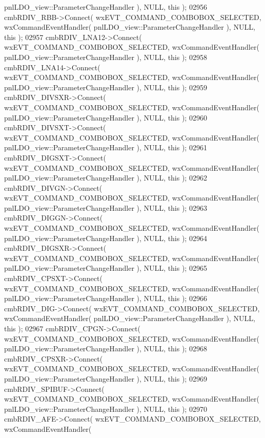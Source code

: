 \begin{DoxyCode}
      pnlLDO_view::ParameterChangeHandler ), NULL, \textcolor{keyword}{this} );
02956     cmbRDIV_RBB->Connect( wxEVT\_COMMAND\_COMBOBOX\_SELECTED, wxCommandEventHandler( 
      pnlLDO_view::ParameterChangeHandler ), NULL, \textcolor{keyword}{this} );
02957     cmbRDIV_LNA12->Connect( wxEVT\_COMMAND\_COMBOBOX\_SELECTED, wxCommandEventHandler( 
      pnlLDO_view::ParameterChangeHandler ), NULL, \textcolor{keyword}{this} );
02958     cmbRDIV_LNA14->Connect( wxEVT\_COMMAND\_COMBOBOX\_SELECTED, wxCommandEventHandler( 
      pnlLDO_view::ParameterChangeHandler ), NULL, \textcolor{keyword}{this} );
02959     cmbRDIV_DIVSXR->Connect( wxEVT\_COMMAND\_COMBOBOX\_SELECTED, wxCommandEventHandler( 
      pnlLDO_view::ParameterChangeHandler ), NULL, \textcolor{keyword}{this} );
02960     cmbRDIV_DIVSXT->Connect( wxEVT\_COMMAND\_COMBOBOX\_SELECTED, wxCommandEventHandler( 
      pnlLDO_view::ParameterChangeHandler ), NULL, \textcolor{keyword}{this} );
02961     cmbRDIV_DIGSXT->Connect( wxEVT\_COMMAND\_COMBOBOX\_SELECTED, wxCommandEventHandler( 
      pnlLDO_view::ParameterChangeHandler ), NULL, \textcolor{keyword}{this} );
02962     cmbRDIV_DIVGN->Connect( wxEVT\_COMMAND\_COMBOBOX\_SELECTED, wxCommandEventHandler( 
      pnlLDO_view::ParameterChangeHandler ), NULL, \textcolor{keyword}{this} );
02963     cmbRDIV_DIGGN->Connect( wxEVT\_COMMAND\_COMBOBOX\_SELECTED, wxCommandEventHandler( 
      pnlLDO_view::ParameterChangeHandler ), NULL, \textcolor{keyword}{this} );
02964     cmbRDIV_DIGSXR->Connect( wxEVT\_COMMAND\_COMBOBOX\_SELECTED, wxCommandEventHandler( 
      pnlLDO_view::ParameterChangeHandler ), NULL, \textcolor{keyword}{this} );
02965     cmbRDIV_CPSXT->Connect( wxEVT\_COMMAND\_COMBOBOX\_SELECTED, wxCommandEventHandler( 
      pnlLDO_view::ParameterChangeHandler ), NULL, \textcolor{keyword}{this} );
02966     cmbRDIV_DIG->Connect( wxEVT\_COMMAND\_COMBOBOX\_SELECTED, wxCommandEventHandler( 
      pnlLDO_view::ParameterChangeHandler ), NULL, \textcolor{keyword}{this} );
02967     cmbRDIV_CPGN->Connect( wxEVT\_COMMAND\_COMBOBOX\_SELECTED, wxCommandEventHandler( 
      pnlLDO_view::ParameterChangeHandler ), NULL, \textcolor{keyword}{this} );
02968     cmbRDIV_CPSXR->Connect( wxEVT\_COMMAND\_COMBOBOX\_SELECTED, wxCommandEventHandler( 
      pnlLDO_view::ParameterChangeHandler ), NULL, \textcolor{keyword}{this} );
02969     cmbRDIV_SPIBUF->Connect( wxEVT\_COMMAND\_COMBOBOX\_SELECTED, wxCommandEventHandler( 
      pnlLDO_view::ParameterChangeHandler ), NULL, \textcolor{keyword}{this} );
02970     cmbRDIV_AFE->Connect( wxEVT\_COMMAND\_COMBOBOX\_SELECTED, wxCommandEventHandler( 

\end{DoxyCode}
